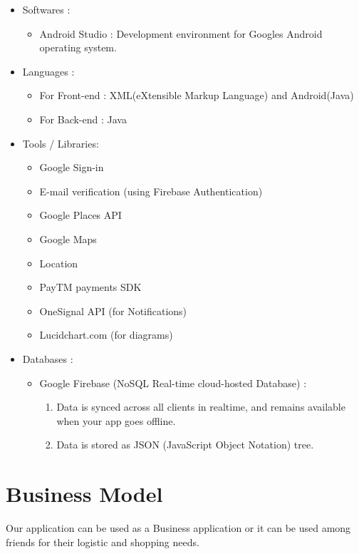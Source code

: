\documentclass{report}
\begin{document}
\begin{itemize}[label=$\diamond$]
\item Softwares :
\begin{itemize}[label=$\rightarrow$]
\item Android Studio : Development environment for Google\textquotesingle s Android operating system.
\end{itemize}
\item Languages :
\begin{itemize}[label=$\rightarrow$]
\item For Front-end : XML(eXtensible Markup Language) and Android(Java)
\item For Back-end : Java
\end{itemize}

\item Tools / Libraries:
\begin{itemize}[label=$\rightarrow$]
\item Google Sign-in
\item E-mail verification (using Firebase Authentication)
\item Google Places API
\item Google Maps
\item Location
\item PayTM payments SDK
\item OneSignal API (for Notifications)
\item Lucidchart.com (for diagrams)
\end{itemize}

\item Databases :
\begin{itemize}[label=$\rightarrow$]
\item Google Firebase (NoSQL Real-time cloud-hosted Database) :
\begin{enumerate}
\item Data is synced across all clients in realtime, and remains available when your app goes offline.
\item Data is stored as JSON (JavaScript Object Notation) tree.
\end{enumerate}
\end{itemize}

\end{itemize}



\chapter{Business Model}
Our application can be used as a Business application or it can be used among friends for their logistic and shopping  needs.
\end{document}
